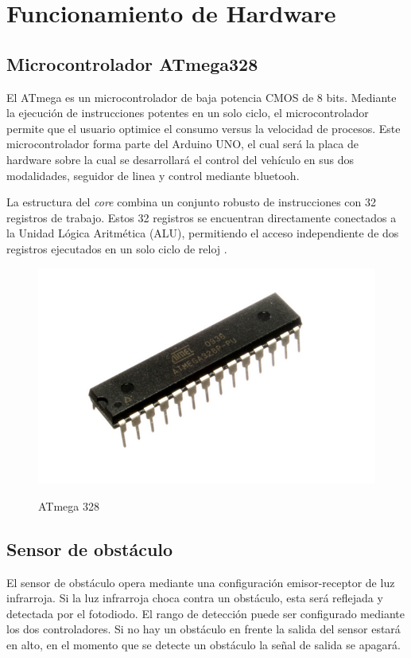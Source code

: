
\section{Funcionamiento de Hardware}

\subsection{Microcontrolador ATmega328}
El ATmega es un microcontrolador de baja potencia CMOS de 8 bits. Mediante la ejecución de instrucciones potentes en un solo ciclo, el microcontrolador permite que el usuario optimice el consumo versus la velocidad de procesos. Este microcontrolador forma parte del Arduino UNO, el cual será la placa de hardware sobre la cual se desarrollará el control del vehículo en sus dos modalidades, seguidor de linea y control mediante bluetooh. 

La estructura del \textit{core} combina un conjunto robusto de instrucciones con 32 registros de trabajo. Estos 32 registros se encuentran directamente conectados a la Unidad
Lógica Aritmética (ALU), permitiendo el acceso independiente de dos registros ejecutados en un solo ciclo de reloj \cite{atmega}. 

\begin{figure}[H]
    \centering
    \includegraphics[width = 7 cm]{imagenes/micro.PNG}
    \caption{ATmega 328}
    \cite{atmega}
\end{figure}

\subsection{Sensor de obstáculo}
El sensor de obstáculo opera mediante una configuración emisor-receptor de luz infrarroja. Si la luz infrarroja choca contra un obstáculo, esta será reflejada y detectada por el fotodiodo. El rango de detección puede ser configurado mediante los dos controladores. Si no hay un obstáculo en frente la salida del sensor estará en alto, en el momento que se detecte un obstáculo la señal de salida se apagará.

